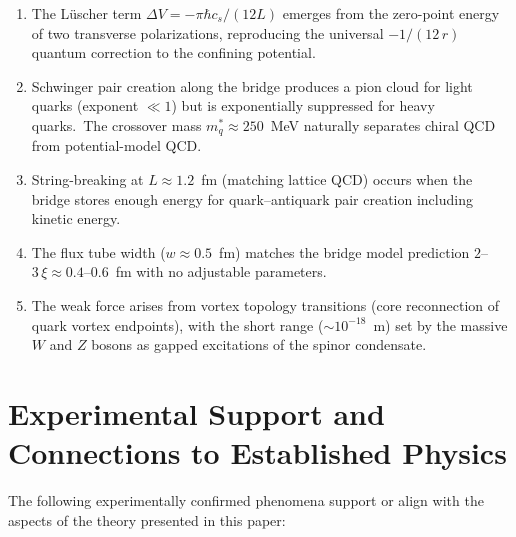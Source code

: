 ﻿\documentclass[12pt,letterpaper]{article}
\newcommand{\Ka}{K_{\!A}}
\begin{document}
\begin{enumerate}[leftmargin=2em]
    constant-$\Ka$ logarithmic EOS), transverse spin-wave oscillations
    ($c_{\mathrm{spin}} = c$, from $K_{\mathrm{spin}} \propto \rho$),
    and gapped breathing modes.
  \item The L\"uscher term $\Delta V = -\pi\hbar c_s/(12L)$ emerges from the
    zero-point energy of two transverse polarizations, reproducing the universal
    $-1/(12\,r)$ quantum correction to the confining potential.
  \item Schwinger pair creation along the bridge produces a pion cloud for light
    quarks (exponent $\ll 1$) but is exponentially suppressed for heavy quarks.\ The
    crossover mass $m_q^* \approx 250$~MeV naturally separates chiral QCD from
    potential-model QCD.
  \item String-breaking at $L \approx 1.2$~fm (matching lattice QCD) occurs when
    the bridge stores enough energy for quark--antiquark pair creation including
    kinetic energy.
  \item The flux tube width ($w \approx 0.5$~fm) matches the bridge model prediction
    $2$--$3\,\xi \approx 0.4$--$0.6$~fm with no adjustable parameters.
  \item The weak force arises from vortex topology transitions (core reconnection
    of quark vortex endpoints), with the short range ($\sim 10^{-18}$~m) set by the
    massive $W$ and $Z$ bosons as gapped excitations of the spinor condensate.
\end{enumerate}




\section{Experimental Support and Connections to Established Physics}

The following experimentally confirmed phenomena support or align with the aspects of the theory presented in this paper:
\end{document}
